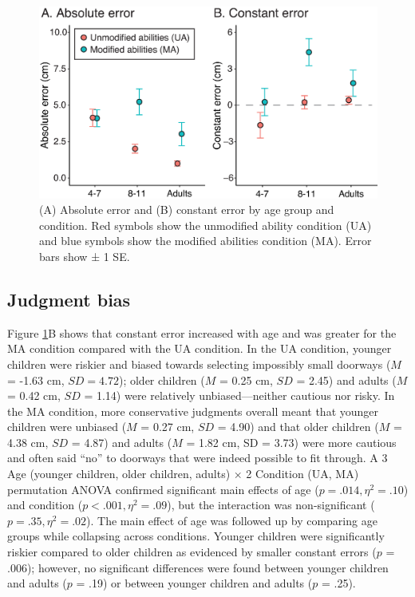 \documentclass[a4paper,man,natbib,floatsintext,noextraspace]{apa6}
\begin{document}
\begin{figure}[htb!]
\centering
\includegraphics[width=1\textwidth]{error.eps}
\caption{\label{fig:error}(A) Absolute error and (B) constant error by age group and condition. Red symbols show the unmodified ability condition (UA) and blue symbols show the modified abilities condition (MA). Error bars show ± 1 SE.}
\end{figure}

\subsection{Judgment bias}

Figure \ref{fig:error}B shows that constant error increased with age and was greater for the MA condition compared with the UA condition. In the UA condition, younger children were riskier and biased towards selecting impossibly small doorways ($M$ = -1.63 cm, $SD = 4.72$); older children ($M$ = 0.25 cm, $SD$ = 2.45) and adults ($M$ = 0.42 cm, $SD$ = 1.14) were relatively unbiased---neither cautious nor risky. In the MA condition, more conservative judgments overall meant that younger children were unbiased ($M$ = 0.27 cm, $SD$ = 4.90) and that older children ($M$ = 4.38 cm, $SD$ = 4.87) and adults ($M$ = 1.82 cm, SD = 3.73) were more cautious and often said “no” to doorways that were indeed possible to fit through. A 3 Age (younger children, older children, adults) × 2 Condition (UA, MA) permutation ANOVA confirmed significant main effects of age ($p = .014, \eta^{2} = .10$) and condition ($p < .001, \eta^{2} = .09$), but the interaction was non-significant ($p = .35, \eta^{2} = .02$). The main effect of age was followed up by comparing age groups while collapsing across conditions. Younger children were significantly riskier compared to older children as evidenced by smaller constant errors ($p$ = .006); however, no significant differences were found between younger children and adults ($p$ = .19) or between younger children and adults ($p$ = .25).
\end{document}
